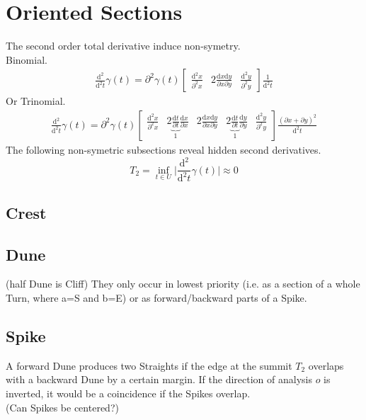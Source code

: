 \documentclass{report}
\begin{document}
\section{Oriented Sections}
The second order total derivative induce non-symetry.\\
Binomial.
\begin{align}
\frac{\mathrm{d}^2}{\mathrm{d}^2t}\gamma(t)=\partial^2 \gamma(t) \begin{bmatrix} \frac{\mathrm{d}^2x}{\partial^2 x} & 2 \frac{\mathrm{d}x\mathrm{d}y}{\partial x \partial y} & \frac{\mathrm{d}^2y}{\partial^2 y}\end{bmatrix}\frac{1}{\mathrm{d}^2t}
\end{align}
Or Trinomial.
\begin{align}
\frac{\mathrm{d}^2}{\mathrm{d}^2t}\gamma(t)=\partial^2 \gamma (t) \begin{bmatrix}\frac{\mathrm{d}^2 x}{\partial^2 x} & 2 \underbrace{\frac{\mathrm{d}t}{\partial t}}_{1} \frac{\mathrm{d}x}{\partial x} & 2 \frac{\mathrm{d}x\mathrm{d}y}{\partial x \partial y} & 2 \underbrace{\frac{\mathrm{d}t}{\partial t}}_{1} \frac{\mathrm{d}y}{\partial y} & \frac{\mathrm{d}^2 y}{\partial^2 y}\end{bmatrix}\frac{(\partial x + \partial y)^2}{\mathrm{d}^2 t}
\end{align}
The following non-symetric subsections reveal hidden second derivatives.
\begin{equation}
T_{2} = \inf_{t \in U} \lvert \frac{\mathrm{d}^2}{\mathrm{d}^2t}\gamma(t) \rvert \approx 0
\end{equation}

\subsection{Crest}

\subsection{Dune}
(half Dune is Cliff)
They only occur in lowest priority (i.e. as a section of a whole Turn, where a=S and b=E) or as forward/backward parts of a Spike.

\subsection{Spike}
A forward Dune produces two Straights if the edge at the summit $T_{2}$ overlaps with a backward Dune by a certain margin. If the direction of analysis $o$ is inverted, it would be a coincidence if the Spikes overlap.\\
(Can Spikes be centered?)
\end{document}
